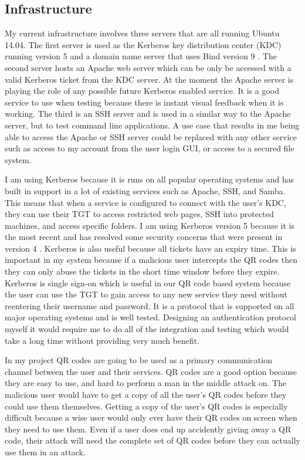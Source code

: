 \documentclass[]{report}   %
\begin{document}
\subsection{Infrastructure}
My current infrastructure involves three servers that are all running Ubuntu 14.04. The first server is used as the Kerberos key distribution center (KDC) running version 5 and a domain name server that uses Bind version 9 \cite{Bind}. The second server hosts an Apache web server which can be only be accessed with a valid Kerberos ticket from the KDC server. At the moment the Apache server is playing the role of any possible future Kerberos enabled service. It is a good service to use when testing because there is instant visual feedback when it is working. The third is an SSH server and is used in a similar way to the Apache server, but to test command line applications. A use case that results in me being able to access the Apache or SSH server could be replaced with any other service such as access to my account from the user login GUI, or access to a secured file system.

I am using Kerberos because it is runs on all popular operating systems and has built in support in a lot of existing services such as Apache, SSH, and Samba. This means that when a service is configured to connect with the user's KDC, they can use their TGT to access restricted web pages, SSH into protected machines, and access specific folders. I am using Kerberos version 5 because it is the most recent and has resolved some security concerns that were present in version 4 \cite{KerbUpdate}. Kerberos is also useful because all tickets have an expiry time. This is important in my system because if a malicious user intercepts the QR codes then they can only abuse the tickets in the short time window before they expire. Kerberos is single sign-on which is useful in our QR code based system because the user can use the TGT to gain access to any new service they need without reentering their username and password. It is a protocol that is supported on all major operating systems and is well tested. Designing an authentication protocol myself it would require me to do all of the integration and testing which would take a long time without providing very much benefit.

In my project QR codes are going to be used as a primary communication channel between the user and their services. QR codes are a good option because they are easy to use, and hard to perform a man in the middle attack on. The malicious user would have to get a copy of all the user's QR codes before they could use them themselves. Getting a copy of the user's QR codes is especially difficult because a wise user would only ever have their QR codes on screen when they need to use them. Even if a user does end up accidently giving away a QR code, their attack will need the complete set of QR codes before they can actually use them in an attack.
\end{document}
